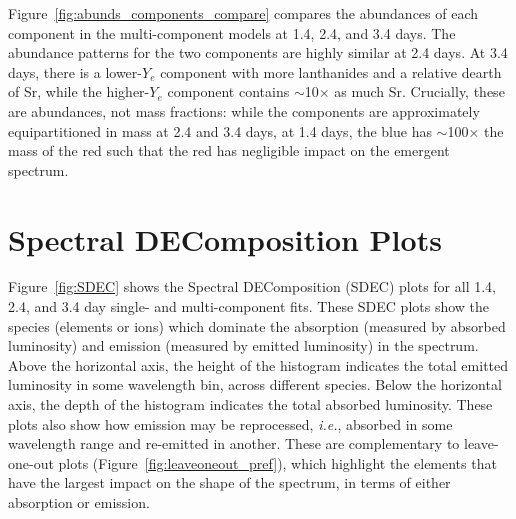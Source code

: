 \documentclass[twocolumn,twocolappendix]{aastex63}
\def\ie{{\it i.e.}}
\begin{document}
{Figure~\ref{fig:abunds_components_compare} compares the abundances of each component in the multi-component models at 1.4, 2.4, and 3.4 days. The abundance patterns for the two components are highly similar at 2.4 days. At 3.4 days, there is a lower-$Y_e$ component with more lanthanides and a relative dearth of Sr, while the higher-$Y_e$ component contains $\sim$10$\times$ as much Sr. Crucially, these are abundances, not mass fractions: while the components are approximately equipartitioned in mass at 2.4 and 3.4 days, at 1.4 days, the blue has $\sim$100$\times$ the mass of the red such that the red has negligible impact on the emergent spectrum.






\section{Spectral DEComposition Plots}\label{app:SDEC}

Figure~\ref{fig:SDEC} shows the Spectral DEComposition (SDEC) plots for all 1.4, 2.4, and 3.4 day single- and multi-component fits. These SDEC plots show the species (elements or ions) which dominate the absorption (measured by absorbed luminosity) and emission (measured by emitted luminosity) in the spectrum. Above the horizontal axis, the height of the histogram indicates the total emitted luminosity in some wavelength bin, across different species. Below the horizontal axis, the depth of the histogram indicates the total absorbed luminosity. These plots also show how emission may be reprocessed, \ie, absorbed in some wavelength range and re-emitted in another. These are complementary to leave-one-out plots (Figure~\ref{fig:leaveoneout_pref}), which highlight the elements that have the largest impact on the shape of the spectrum, in terms of either absorption or emission.


\newlength{\SDECheight} %
\setlength{\SDECheight}{+5.6cm} %

}
\end{document}

